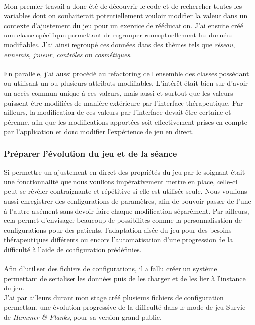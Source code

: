 \paragraph{}
Mon premier travail a donc été de découvrir le code et de rechercher toutes les variables dont on souhaiterait potentiellement vouloir modifier la valeur dans un contexte d'ajustement du jeu pour un exercice de rééducation. J'ai ensuite créé une classe spécifique permettant de regrouper conceptuellement les données modifiables. J'ai ainsi regroupé ces données dans des thèmes tels que \emph{réseau}, \emph{ennemis}, \emph{joueur}, \emph{contrôles} ou \emph{cosmétiques}.

\paragraph{}
En parallèle, j'ai aussi procédé au refactoring de l'ensemble des classes possédant ou utilisant un ou plusieurs attributs modifiables. L'intérêt était bien sur d'avoir un accès commun unique à ces valeurs, mais aussi et surtout que les valeurs puissent être modifiées de manière extérieure par l'interface thérapeutique. Par ailleurs, la modification de ces valeurs par l'interface devait être certaine et pérenne, afin que les modifications apportées soit effectivement prises en compte par l'application et donc modifier l'expérience de jeu en direct.

	\subsubsection*{Préparer l'évolution du jeu et de la séance}
Si permettre un ajustement en direct des propriétés du jeu par le soignant était une fonctionnalité que nous voulions impérativement mettre en place, celle-ci peut se révéler contraignante et répétitive si elle est utilisée seule. Nous voulions aussi enregistrer des configurations de paramètres, afin de pouvoir passer de l'une à l'autre aisément sans devoir faire chaque modification séparément. Par ailleurs, cela permet d'envisager beaucoup de possibilités comme la personnalisation de configurations pour des patients, l'adaptation aisée du jeu pour des besoins thérapeutiques différents ou encore l'automatisation d'une progression de la difficulté à l'aide de configuration prédéfinies.

\paragraph{}Afin d'utiliser des fichiers de configurations, il a fallu créer un système permettant de serialiser les données puis de les charger et de les lier à l'instance de jeu.\\
J'ai par ailleurs durant mon stage créé plusieurs fichiers de configuration permettant une évolution progressive de la difficulté dans le mode de jeu Survie de \emph{Hammer \& Planks}, pour sa version grand public.

